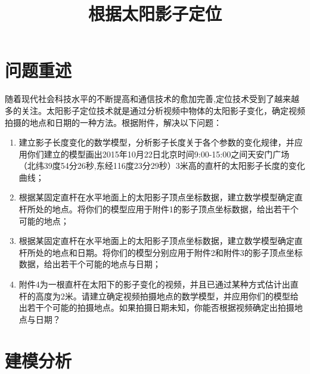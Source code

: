 \documentclass[nocover]{cumcmart}%
\begin{document}


\title{根据太阳影子定位}
\maketitle






\section{问题重述}

随着现代社会科技水平的不断提高和通信技术的愈加完善,定位技术受到了越来越多的关注。太阳影子定位技术就是通过分析视频中物体的太阳影子变化，确定视频拍摄的地点和日期的一种方法。根据附件，解决以下问题：
\begin{enumerate}
\item 建立影子长度变化的数学模型，分析影子长度关于各个参数的变化规律，并应用你们建立的模型画出2015年10月22日北京时间9:00-15:00之间天安门广场（北纬39度54分26秒,东经116度23分29秒）3米高的直杆的太阳影子长度的变化曲线；
\item 根据某固定直杆在水平地面上的太阳影子顶点坐标数据，建立数学模型确定直杆所处的地点。将你们的模型应用于附件1的影子顶点坐标数据，给出若干个可能的地点；
\item 根据某固定直杆在水平地面上的太阳影子顶点坐标数据，建立数学模型确定直杆所处的地点和日期。将你们的模型分别应用于附件2和附件3的影子顶点坐标数据，给出若干个可能的地点与日期；
\item 附件4为一根直杆在太阳下的影子变化的视频，并且已通过某种方式估计出直杆的高度为2米。请建立确定视频拍摄地点的数学模型，并应用你们的模型给出若干个可能的拍摄地点。如果拍摄日期未知，你能否根据视频确定出拍摄地点与日期？
\end{enumerate}

\section{建模分析}
\end{document}
